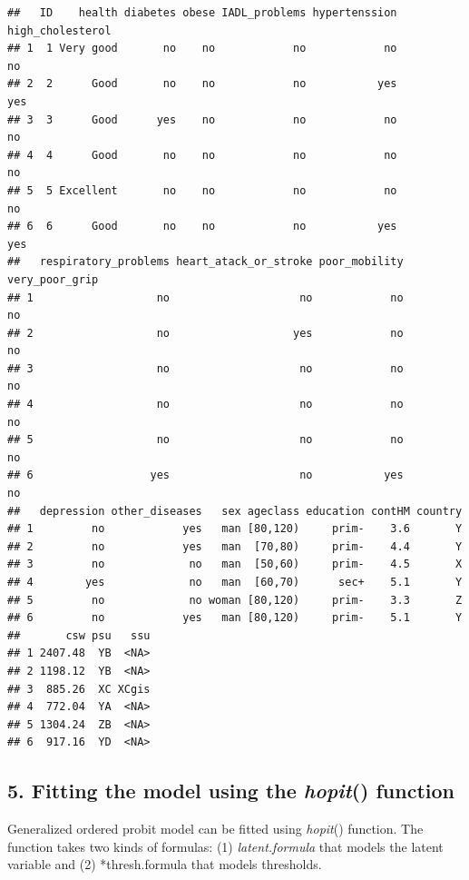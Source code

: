\documentclass[]{article}
\begin{document}
\begin{verbatim}
##   ID    health diabetes obese IADL_problems hypertenssion high_cholesterol
## 1  1 Very good       no    no            no            no               no
## 2  2      Good       no    no            no           yes              yes
## 3  3      Good      yes    no            no            no               no
## 4  4      Good       no    no            no            no               no
## 5  5 Excellent       no    no            no            no               no
## 6  6      Good       no    no            no           yes              yes
##   respiratory_problems heart_atack_or_stroke poor_mobility very_poor_grip
## 1                   no                    no            no             no
## 2                   no                   yes            no             no
## 3                   no                    no            no             no
## 4                   no                    no            no             no
## 5                   no                    no            no             no
## 6                  yes                    no           yes             no
##   depression other_diseases   sex ageclass education contHM country
## 1         no            yes   man [80,120)     prim-    3.6       Y
## 2         no            yes   man  [70,80)     prim-    4.4       Y
## 3         no             no   man  [50,60)     prim-    4.5       X
## 4        yes             no   man  [60,70)      sec+    5.1       Y
## 5         no             no woman [80,120)     prim-    3.3       Z
## 6         no            yes   man [80,120)     prim-    5.1       Y
##       csw psu   ssu
## 1 2407.48  YB  <NA>
## 2 1198.12  YB  <NA>
## 3  885.26  XC XCgis
## 4  772.04  YA  <NA>
## 5 1304.24  ZB  <NA>
## 6  917.16  YD  <NA>
\end{verbatim}

\hypertarget{fitting-the-model-using-the-hopit-function}{%
\subsection{\texorpdfstring{5. Fitting the model using the
\emph{hopit}()
function}{5. Fitting the model using the hopit() function}}\label{fitting-the-model-using-the-hopit-function}}

Generalized ordered probit model can be fitted using \emph{hopit}()
function. The function takes two kinds of formulas: (1)
\emph{latent.formula} that models the latent variable and (2)
*thresh.formula that models thresholds.
\end{document}
